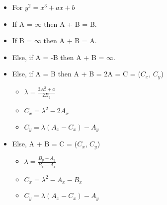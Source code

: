 \begin{itemize}
    \item[] For $y^2 = x^3 + ax + b$
\end{itemize}
\begin{itemize}
    \item[] If A = $\infty$ then A + B = B.
    \item[] If B = $\infty$ then A + B = A.
    \item[] Else, if A = -B then A + B = $\infty$.
    \item[] Else, if A = B  then A + B = 2A = C = ($C_x$, $C_y$)
    \begin{itemize}
        \item[] $\lambda = \frac{3A_x^2 + a} {2B_y}$
        \item[] $C_x = \lambda^2 - 2A_x$
        \item[] $C_y = \lambda(A_x - C_x) - A_y$
    \end{itemize}
    \item[] Else, A + B = C = ($C_x$, $C_y$)
    \begin{itemize}
        \item[] $\lambda = \frac{B_y - A_y} {B_x - A_x}$
        \item[] $C_x = \lambda^2 - A_x - B_x$
        \item[] $C_y = \lambda(A_x - C_x) - A_y$
    \end{itemize}
\end{itemize}

